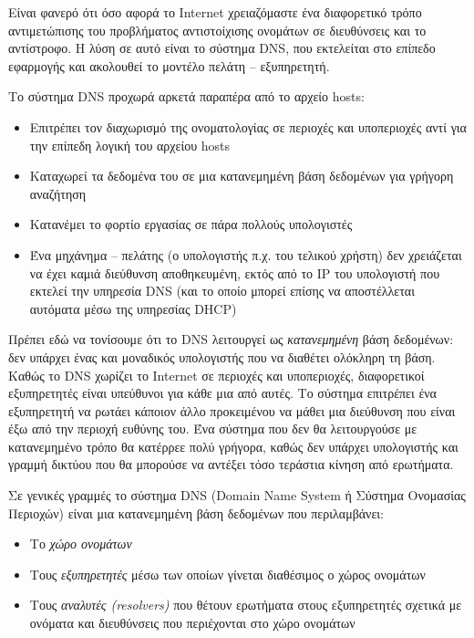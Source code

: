 Είναι φανερό ότι όσο αφορά το Internet χρειαζόμαστε ένα διαφορετικό τρόπο αντιμετώπισης του προβλήματος αντιστοίχισης ονομάτων σε διευθύνσεις και το αντίστροφο. Η λύση σε αυτό είναι το σύστημα DNS, που εκτελείται στο επίπεδο εφαρμογής και ακολουθεί το μοντέλο πελάτη -- εξυπηρετητή.

Το σύστημα DNS προχωρά αρκετά παραπέρα από το αρχείο hosts:

\begin{itemize}
\item Επιτρέπει τον διαχωρισμό της ονοματολογίας σε περιοχές και υποπεριοχές αντί για την επίπεδη λογική του αρχείου hosts
\item Καταχωρεί τα δεδομένα του σε μια κατανεμημένη βάση δεδομένων για γρήγορη αναζήτηση
\item Κατανέμει το φορτίο εργασίας σε πάρα πολλούς υπολογιστές
\item Ένα μηχάνημα -- πελάτης (ο υπολογιστής π.χ. του τελικού χρήστη) δεν χρειάζεται να έχει καμιά διεύθυνση αποθηκευμένη, εκτός από το IP του υπολογιστή που εκτελεί την υπηρεσία DNS (και το οποίο μπορεί επίσης να αποστέλλεται αυτόματα μέσω της υπηρεσίας DHCP)
\end{itemize}

Πρέπει εδώ να τονίσουμε ότι το DNS λειτουργεί ως \emph{κατανεμημένη} βάση δεδομένων: δεν υπάρχει ένας και μοναδικός υπολογιστής που να διαθέτει ολόκληρη τη βάση. Καθώς το DNS χωρίζει το Internet σε περιοχές και υποπεριοχές, διαφορετικοί εξυπηρετητές είναι υπεύθυνοι για κάθε μια από αυτές. Το σύστημα επιτρέπει ένα εξυπηρετητή να ρωτάει κάποιον άλλο προκειμένου να μάθει μια διεύθυνση που είναι έξω από την περιοχή ευθύνης του. Ένα σύστημα που δεν θα λειτουργούσε με κατανεμημένο τρόπο θα κατέρρεε πολύ γρήγορα, καθώς δεν υπάρχει υπολογιστής και γραμμή δικτύου που θα μπορούσε να αντέξει τόσο τεράστια κίνηση από ερωτήματα.

Σε γενικές γραμμές το σύστημα DNS (Domain Name System ή Σύστημα Ονομασίας Περιοχών) είναι μια κατανεμημένη βάση δεδομένων που περιλαμβάνει:

\begin{itemize}
\item Το \emph{χώρο ονομάτων}
\item Τους \emph{εξυπηρετητές} μέσω των οποίων γίνεται διαθέσιμος ο χώρος ονομάτων
\item Τους \emph{αναλυτές (resolvers)} που θέτουν ερωτήματα στους εξυπηρετητές σχετικά με ονόματα και διευθύνσεις που περιέχονται στο χώρο ονομάτων
\end{itemize}

